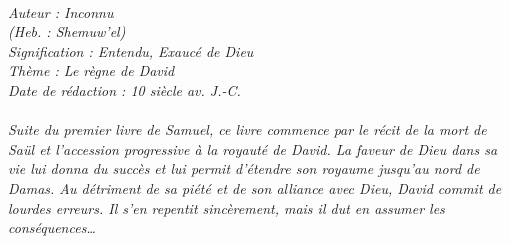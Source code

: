 \BFont
\noindent\hrulefill
{\footnotesize
\textit{
\bigskip
{\centering{}
\\Auteur : Inconnu
\\(Heb. : Shemuw'el)
\\Signification : Entendu, Exaucé de Dieu
\\Thème : Le règne de David
\\Date de rédaction : 10 siècle av. J.-C.\\}
}
\textit{
\\Suite du premier livre de Samuel, ce livre commence par le récit de la mort de Saül et l'accession progressive à la royauté de David. La faveur de Dieu dans sa vie lui donna du succès et lui permit d'étendre son royaume jusqu'au nord de Damas. Au détriment de sa piété et de son alliance avec Dieu, David commit de lourdes erreurs. Il s'en repentit sincèrement, mais il dut en assumer les conséquences…\bigskip
}
}
\par\nobreak\noindent\hrulefill
